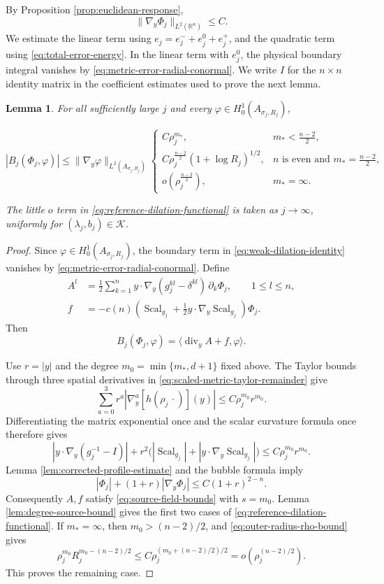 \documentclass[11pt]{article}
\numberwithin{equation}{section}
\newtheorem{lemma}[theorem]{Lemma}
\theoremstyle{remark}
\newcommand{\R}{\mathbb R}
\newcommand{\norm}[1]{\lVert #1\rVert}
\begin{document}
By Proposition  \ref{prop:euclidean-response},
\[
 \norm{\nabla_y\Phi_j}_{L^2(\R^n)}\le C.
\]
We estimate the linear term using
\(e_j=e_j^-+e_j^0+e_j^+\), and the quadratic term using
\eqref{eq:total-error-energy}. In the linear term with \(e_j^0\),
the physical boundary integral vanishes by
\eqref{eq:metric-error-radial-conormal}.
We write \(I\) for the \(n\times n\) identity matrix in the coefficient
estimates used to prove the next lemma.
\begin{lemma}\label{lem:reference-dilation-functional}
For all sufficiently large \(j\) and every
\(\varphi\in H_0^1(A_{\sigma_j,R_j})\),
 
\begin{equation}\label{eq:reference-dilation-functional}
 | B_j(\Phi_j,\varphi)|
 \le\norm{\nabla_y\varphi}_{L^2(A_{\sigma_j,R_j})}
 \begin{cases}
  C\rho_j^{m_*},&m_*<\frac{n-2}{2},\\
  C\rho_j^{\frac{n-2}{2}}(1+\log R_j)^{1/2},&n\text{ is even and }m_*=\frac{n-2}{2},\\
  o(\rho_j^{\frac{n-2}{2}}),&m_*=\infty.
 \end{cases}
\end{equation}

The little \(o\) term in \eqref{eq:reference-dilation-functional} is
taken as \(j\to\infty\), uniformly for
\((\lambda_j,b_j)\in\mathcal K\).
\end{lemma}

\begin{proof}
Since \(\varphi\in H_0^1(A_{\sigma_j,R_j})\), the boundary term in
\eqref{eq:weak-dilation-identity} vanishes by
\eqref{eq:metric-error-radial-conormal}. Define
\[
 \begin{aligned}
 A^l&=\frac12\sum_{k=1}^n
 y\cdot\nabla_y(g_j^{kl}-\delta^{kl})\,\partial_k\Phi_j,
 \qquad 1\le l\le n,\\
 f&=-c(n)\left(\operatorname{Scal}_{g_j}+\frac12y\cdot\nabla_y\operatorname{Scal}_{g_j}\right)\Phi_j.
 \end{aligned}
\]
Then
\[
  B_j(\Phi_j,\varphi)
 =\langle\operatorname{div}_y A+f,\varphi\rangle.
\]

Use \(r=|y|\) and the degree \(m_0=\min\{m_*,d+1\}\) fixed above.
The Taylor bounds through three spatial derivatives in
\eqref{eq:scaled-metric-taylor-remainder} give
\[
 \sum_{a=0}^3r^a|\nabla_y^a[h(\rho_j\,\cdot)](y)|
 \le C\rho_j^{m_0}r^{m_0}.
\]
Differentiating the matrix exponential once and the scalar curvature
formula once therefore gives
\[
 |y\cdot\nabla_y(g_j^{-1}-I)|
 +r^2\bigl(|\operatorname{Scal}_{g_j}|+|y\cdot\nabla_y\operatorname{Scal}_{g_j}|\bigr)
 \le C\rho_j^{m_0}r^{m_0}.
\]
Lemma  \ref{lem:corrected-profile-estimate} and the bubble formula imply
\[
 |\Phi_j|+(1+r)|\nabla_y\Phi_j|\le C(1+r)^{2-n}.
\]
Consequently \(A,f\) satisfy \eqref{eq:source-field-bounds} with \(s=m_0\).
Lemma  \ref{lem:degree-source-bound} gives the first two cases of
\eqref{eq:reference-dilation-functional}. If \(m_*=\infty\), then
\(m_0>(n-2)/2\), and \eqref{eq:outer-radius-rho-bound} gives
\[
 \rho_j^{m_0}R_j^{m_0-(n-2)/2}
 \le C\rho_j^{(m_0+(n-2)/2)/2}
 =o(\rho_j^{(n-2)/2}).
\]
This proves the remaining case.
\end{proof}
\end{document}
